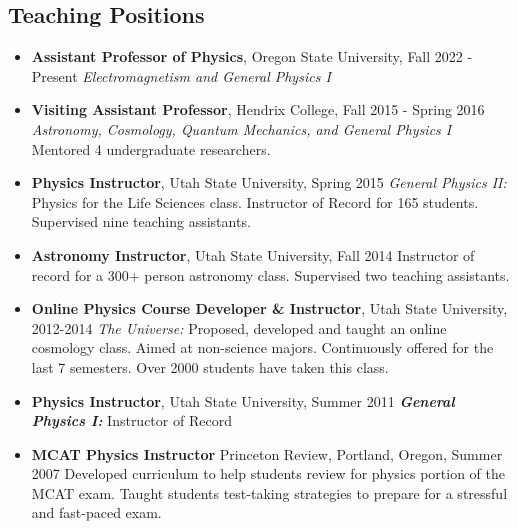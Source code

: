 \documentclass[11pt,letterpaper,sans,unicode]{moderncv}
\newcommand{\blucirc}{{\color{color1} $\circ\;\;$}}
\begin{document}
\subsection{Teaching Positions}
	\renewcommand\labelitemi{\blucirc}
	\begin{itemize}[leftmargin=8mm]
	\setlength\itemsep{1mm}
	\item \textbf{\color{color1} Assistant Professor of Physics}, Oregon State University, \hfill Fall 2022 - Present
        		\newline  \textit{Electromagnetism and General Physics I}
	\item \textbf{\color{color1} Visiting Assistant Professor}, Hendrix College, \hfill Fall 2015 - Spring 2016
        		\newline  \textit{Astronomy, Cosmology, Quantum Mechanics, and General Physics I}
		\newline Mentored 4 undergraduate researchers.
        \item \textbf{\color{color1} Physics Instructor}, Utah State University, \hfill Spring 2015
        		\newline \textit{General Physics II:} Physics for the Life Sciences class.
		\newline Instructor of Record for 165 students.
		\newline Supervised nine teaching assistants.
        \item \textbf{\color{color1} Astronomy Instructor}, Utah State University, \hfill Fall 2014
        		\newline Instructor of record for a 300+ person astronomy class.
		\newline Supervised two teaching assistants.
        \item \textbf{\color{color1} Online Physics Course Developer \& Instructor}, Utah State University, \hfill 2012-2014
        		\newline \textit{The Universe:} Proposed, developed and taught an online cosmology class.
		\newline Aimed at non-science majors.
		\newline Continuously offered for the last 7 semesters.
		\newline Over 2000 students have taken this class.
        \item \textbf{\color{color1} Physics Instructor}, Utah State University, \hfill Summer 2011
        		\newline \textbf\emph{General Physics I:} Instructor of Record
	\item \textbf{\color{color1} MCAT Physics Instructor} Princeton Review, Portland, Oregon, \hfill Summer 2007
		\newline Developed curriculum to help students review for physics portion of the MCAT exam.
		\newline Taught students test-taking strategies to prepare for a stressful and fast-paced exam.
	\end{itemize}
\end{document}
